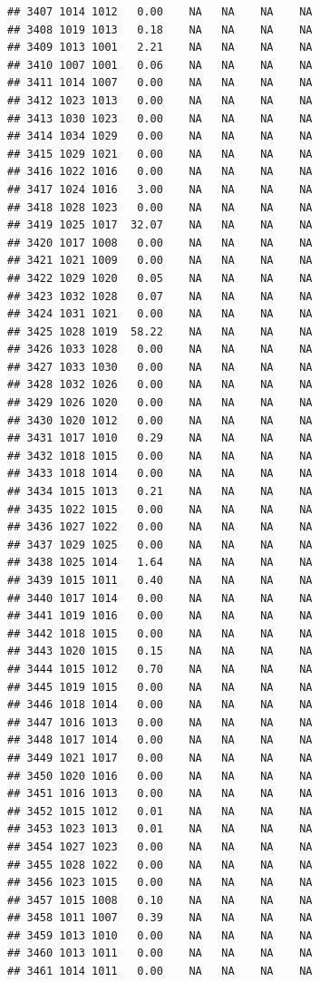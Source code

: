 \documentclass{article}\usepackage{graphicx, color}
\makeatletter
\newenvironment{kframe}{%
 \def\at@end@of@kframe{}%
 \ifinner\ifhmode%
  \def\at@end@of@kframe{\end{minipage}}%
  \begin{minipage}{\columnwidth}%
 \fi\fi%
 \def\FrameCommand##1{\hskip\@totalleftmargin \hskip-\fboxsep
 \colorbox{shadecolor}{##1}\hskip-\fboxsep
     \hskip-\linewidth \hskip-\@totalleftmargin \hskip\columnwidth}%
 \MakeFramed {\advance\hsize-\width
   \@totalleftmargin\z@ \linewidth\hsize
   \@setminipage}}%
 {\par\unskip\endMakeFramed%
 \at@end@of@kframe}
\newenvironment{knitrout}{}{} %
\makeatother
\begin{document}
\begin{knitrout}
\begin{kframe}
\begin{verbatim}
## 3407 1014 1012   0.00    NA   NA    NA    NA
## 3408 1019 1013   0.18    NA   NA    NA    NA
## 3409 1013 1001   2.21    NA   NA    NA    NA
## 3410 1007 1001   0.06    NA   NA    NA    NA
## 3411 1014 1007   0.00    NA   NA    NA    NA
## 3412 1023 1013   0.00    NA   NA    NA    NA
## 3413 1030 1023   0.00    NA   NA    NA    NA
## 3414 1034 1029   0.00    NA   NA    NA    NA
## 3415 1029 1021   0.00    NA   NA    NA    NA
## 3416 1022 1016   0.00    NA   NA    NA    NA
## 3417 1024 1016   3.00    NA   NA    NA    NA
## 3418 1028 1023   0.00    NA   NA    NA    NA
## 3419 1025 1017  32.07    NA   NA    NA    NA
## 3420 1017 1008   0.00    NA   NA    NA    NA
## 3421 1021 1009   0.00    NA   NA    NA    NA
## 3422 1029 1020   0.05    NA   NA    NA    NA
## 3423 1032 1028   0.07    NA   NA    NA    NA
## 3424 1031 1021   0.00    NA   NA    NA    NA
## 3425 1028 1019  58.22    NA   NA    NA    NA
## 3426 1033 1028   0.00    NA   NA    NA    NA
## 3427 1033 1030   0.00    NA   NA    NA    NA
## 3428 1032 1026   0.00    NA   NA    NA    NA
## 3429 1026 1020   0.00    NA   NA    NA    NA
## 3430 1020 1012   0.00    NA   NA    NA    NA
## 3431 1017 1010   0.29    NA   NA    NA    NA
## 3432 1018 1015   0.00    NA   NA    NA    NA
## 3433 1018 1014   0.00    NA   NA    NA    NA
## 3434 1015 1013   0.21    NA   NA    NA    NA
## 3435 1022 1015   0.00    NA   NA    NA    NA
## 3436 1027 1022   0.00    NA   NA    NA    NA
## 3437 1029 1025   0.00    NA   NA    NA    NA
## 3438 1025 1014   1.64    NA   NA    NA    NA
## 3439 1015 1011   0.40    NA   NA    NA    NA
## 3440 1017 1014   0.00    NA   NA    NA    NA
## 3441 1019 1016   0.00    NA   NA    NA    NA
## 3442 1018 1015   0.00    NA   NA    NA    NA
## 3443 1020 1015   0.15    NA   NA    NA    NA
## 3444 1015 1012   0.70    NA   NA    NA    NA
## 3445 1019 1015   0.00    NA   NA    NA    NA
## 3446 1018 1014   0.00    NA   NA    NA    NA
## 3447 1016 1013   0.00    NA   NA    NA    NA
## 3448 1017 1014   0.00    NA   NA    NA    NA
## 3449 1021 1017   0.00    NA   NA    NA    NA
## 3450 1020 1016   0.00    NA   NA    NA    NA
## 3451 1016 1013   0.00    NA   NA    NA    NA
## 3452 1015 1012   0.01    NA   NA    NA    NA
## 3453 1023 1013   0.01    NA   NA    NA    NA
## 3454 1027 1023   0.00    NA   NA    NA    NA
## 3455 1028 1022   0.00    NA   NA    NA    NA
## 3456 1023 1015   0.00    NA   NA    NA    NA
## 3457 1015 1008   0.10    NA   NA    NA    NA
## 3458 1011 1007   0.39    NA   NA    NA    NA
## 3459 1013 1010   0.00    NA   NA    NA    NA
## 3460 1013 1011   0.00    NA   NA    NA    NA
## 3461 1014 1011   0.00    NA   NA    NA    NA

\end{verbatim}
\end{kframe}
\end{knitrout}
\end{document}
